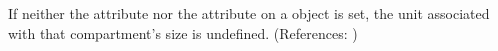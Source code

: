 If neither the attribute  nor the attribute
 on a \Compartment object is set, the unit
associated with that compartment's size is undefined.  (References: )
